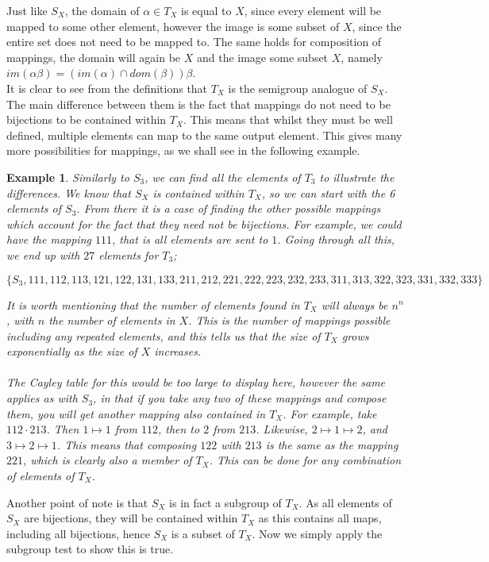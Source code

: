 \documentclass[12pt]{article}
\newtheorem{ex}[theorem]{Example}
\begin{document}
\noindent Just like $S_X$, the domain of $\alpha \in T_X$ is equal to $X$, since every element will be mapped to some other element, however the image is some subset of $X$, since the entire set does not need to be mapped to. The same holds for composition of mappings, the domain will again be $X$ and the image some subset $X$, namely $im(\alpha\beta)=(im(\alpha) \cap dom(\beta))\beta$.\\
It is clear to see from the definitions that $T_X$ is the semigroup analogue of $ S_X$. The main difference between them is the fact that mappings do not need to be bijections to be contained within $T_X$. This means that whilst they must be well defined, multiple elements can map to the same output element. This gives many more possibilities for mappings, as we shall see in the following example.
\begin{ex}
	Similarly to $S_3$, we can find all the elements of $T_3$ to illustrate the differences. We know that $S_X$ is contained within $T_X$, so we can start with the 6 elements of $S_3$. From there it is a case of finding the other possible mappings which account for the fact that they need not be bijections. For example, we could have the mapping $111$, that is all elements are sent to $1$. Going through all this, we end up with $27$ elements for $T_3$;
	\begin{center}
		\begingroup
			\fontsize{11pt}{12pt}\selectfont
				$\{S_3,111,112,113,121,122,131,133,211,212,221,222,223,232,233,311,313,322,323,331,332,333\}$
		\endgroup
	\end{center}
	\noindent It is worth mentioning that the number of elements found in $T_X$ will always be $n^n$, with $n$ the number of elements in $X$. This is the number of mappings possible including any repeated elements, and this tells us that the size of $T_X$ grows exponentially as the size of $X$ increases.\\
\\The Cayley table for this would be too large to display here, however the same applies as with $S_3$, in that if you take any two of these mappings and compose them, you will get another mapping also contained in $T_X$. For example, take $112 \cdot 213$. Then $1 \mapsto 1$ from $112$, then to $2$ from $213$. Likewise, $2 \mapsto 1 \mapsto 2$, and $3 \mapsto 2 \mapsto 1$. This means that composing $122$ with $213$ is the same as the mapping $221$, which is clearly also a member of $T_X$. This can be done for any combination of elements of $T_X$.
\end{ex}
\noindent Another point of note is that $S_X$ is in fact a subgroup of $T_X$. As all elements of $S_X$ are bijections, they will be contained within $T_X$ as this contains all maps, including all bijections, hence $S_X$ is a subset of $T_X$. Now we simply apply the subgroup test to show this is true.\\
\end{document}
